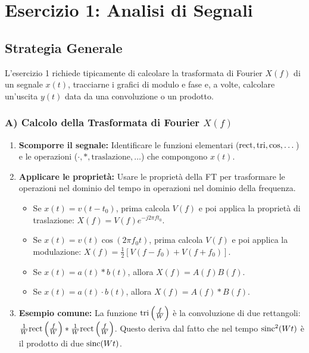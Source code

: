 \chapter{Esercizio 1: Analisi di Segnali}

\section{Strategia Generale}
L'esercizio 1 richiede tipicamente di calcolare la trasformata di Fourier $X(f)$ di un segnale $x(t)$, tracciarne i grafici di modulo e fase e, a volte, calcolare un'uscita $y(t)$ data da una convoluzione o un prodotto.

\subsection{A) Calcolo della Trasformata di Fourier $X(f)$}
\begin{enumerate}
    \item \textbf{Scomporre il segnale:} Identificare le funzioni elementari ($\text{rect}, \text{tri}, \cos, \dots$) e le operazioni ($\cdot, *, \text{traslazione}, \dots$) che compongono $x(t)$.
    \item \textbf{Applicare le proprietà:} Usare le proprietà della FT per trasformare le operazioni nel dominio del tempo in operazioni nel dominio della frequenza.
    \begin{itemize}
        \item Se $x(t) = v(t-t_0)$, prima calcola $V(f)$ e poi applica la proprietà di traslazione: $X(f) = V(f)e^{-j2\pi ft_0}$.
        \item Se $x(t) = v(t)\cos(2\pi f_0 t)$, prima calcola $V(f)$ e poi applica la modulazione: $X(f) = \frac{1}{2}[V(f-f_0) + V(f+f_0)]$.
        \item Se $x(t) = a(t) * b(t)$, allora $X(f) = A(f)B(f)$.
        \item Se $x(t) = a(t) \cdot b(t)$, allora $X(f) = A(f) * B(f)$.
    \end{itemize}
    \item \textbf{Esempio comune:} La funzione $\text{tri}\left(\frac{f}{W}\right)$ è la convoluzione di due rettangoli: $\frac{1}{W} \text{rect}\left(\frac{f}{W}\right) * \frac{1}{W} \text{rect}\left(\frac{f}{W}\right)$. Questo deriva dal fatto che nel tempo $\text{sinc}^2(Wt)$ è il prodotto di due $\text{sinc}(Wt)$.
\end{enumerate}

